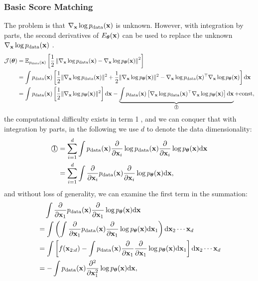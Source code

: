 \documentclass{article}
\begin{document}
\subsubsection{Basic Score Matching}\label{sec.SM}
The problem is that $\nabla_{\mathbf{x}} \log p_{\rm{data}}({\mathbf{x}})$ is unknown. However, with integration by parts, the second derivatives of $E_{\bm{\theta}}({\mathbf{x}})$ can be used to replace the unknown $\nabla_{\mathbf{x}} \log p_{\rm{data}}({\mathbf{x}})$ \citep{hyvarinen2005estimation}.
\begin{equation}
    \begin{aligned}
        \mathcal{J({\bm{\theta}})} &= \mathbb{E}_{p_{\rm{data}}({\mathbf{x}})}\left[ \frac{1}{2}\left\|\nabla_{\mathbf{x}} \log p_{\rm{data}}(\mathbf{x})-\nabla_{\mathbf{x}} \log p_{\boldsymbol{\theta}}(\mathbf{x})\right\|^2 \right] \\
        &= \int p_{\rm{data}}({\mathbf{x}})\left[ \frac{1}{2}\| \nabla_{\mathbf{x}} \log p_{\rm{data}}({\mathbf{x}}) \|^2 + \frac{1}{2} \| \nabla_{\mathbf{x}}\log p_{\bm{\theta}}({\mathbf{x}}) \|^2 - \nabla_{\mathbf{x}} \log p_{\rm{data}}({\mathbf{x}})^\top \nabla_{\mathbf{x}}\log p_{\bm{\theta}}({\mathbf{x}}) \right]\mathrm{d} {\mathbf{x}} \\
        &= \int p_{\rm{data}}({\mathbf{x}})\left[ \frac{1}{2} \| \nabla_{\mathbf{x}}\log p_{\bm{\theta}}({\mathbf{x}}) \|^2 \right] \mathrm{d}{\mathbf{x}} - \underbrace{\int p_{\rm{data}}({\mathbf{x}}) \left[ \nabla_{\mathbf{x}} \log p_{\rm{data}}({\mathbf{x}})^\top \nabla_{\mathbf{x}}\log p_{\bm{\theta}}({\mathbf{x}}) \right] \mathrm{d}{\mathbf{x}}}_{\text{\textcircled{1}}}  + \text{const},
    \end{aligned}
\end{equation}
the computational difficulty exists in term \textcircled{1}, and we can conquer that with integration by parts, in the following we use $d$ to denote the data dimensionality:
\begin{equation}
    \begin{aligned}
        \text{\textcircled{1}}
        &= \sum_{i=1}^{d}\int p_{\rm{data}}({\mathbf{x}})\frac{\partial}{\partial {\mathbf{x}}_i}\log p_{\rm{data}}({\mathbf{x}})\frac{\partial}{\partial {\mathbf{x}}_i}\log p_{\bm{\theta}}({\mathbf{x}})\mathrm{d} {\mathbf{x}} \\
        &= \sum_{i=1}^d \int \frac{\partial}{\partial {\mathbf{x}}_i}p_{\rm{data}}({\mathbf{x}}) \frac{\partial}{\partial {\mathbf{x}}_i}\log p_{\bm{\theta}}({\mathbf{x}})\mathrm{d} {\mathbf{x}},
    \end{aligned}
\end{equation}
and without loss of generality, we can examine the first term in the summation:
\begin{equation}\label{eq.IBP}
    \begin{aligned}
        &\quad\int \frac{\partial}{\partial {\mathbf{x}}_1}p_{\rm{data}}({\mathbf{x}}) \frac{\partial}{\partial {\mathbf{x}}_1}\log p_{\bm{\theta}}({\mathbf{x}})\mathrm{d} {\mathbf{x}} \\
        &= \int \left( \int  \frac{\partial}{\partial {\mathbf{x}}_1}p_{\rm{data}}({\mathbf{x}}) \frac{\partial}{\partial {\mathbf{x}}_1}\log p_{\bm{\theta}}({\mathbf{x}})\mathrm{d} {\mathbf{x}}_1 \right) \mathrm{d} {\mathbf{x}}_2\cdots{\mathbf{x}}_d \\
        &= \int \left[ f({\mathbf{x}}_{2:d}) - \int p_{\rm{data}}({\mathbf{x}})\frac{\partial}{\partial {\mathbf{x}}_1}\frac{\partial}{\partial {\mathbf{x}}_1}\log p_{\bm{\theta}}({\mathbf{x}})\mathrm{d}{\mathbf{x}}_1\right]\mathrm{d} {\mathbf{x}}_2\cdots{\mathbf{x}}_d \\
        &= -\int p_{\rm{data}}({\mathbf{x}}) \frac{\partial^2}{\partial {\mathbf{x}}_1^2}\log p_{\bm{\theta}}({\mathbf{x}})\mathrm{d}{\mathbf{x}},
    \end{aligned}
\end{equation}
\end{document}
